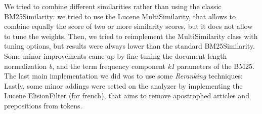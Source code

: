We tried to combine different similarities rather than using the classic BM25Similarity: we tried to use the Lucene MultiSimilarity, that allows to combine equally the score of two or more similarity scores, but it does not allow to
tune the weights. Then, we tried to reimplement the MultiSimilarity class with tuning options, but results were always lower than the standard BM25Similarity. Some minor improvements came up by fine tuning the document-length
normalization \textit{b}, and the term frequency component \textit{k1} parameters of the BM25.
The last main implementation we did was to use some \textit{Reranking} techniques:  
Lastly, some minor addings were setted on the analyzer by implementing the Lucene ElisionFilter (for french), that aims to remove apostrophed articles and prepositions from tokens.
